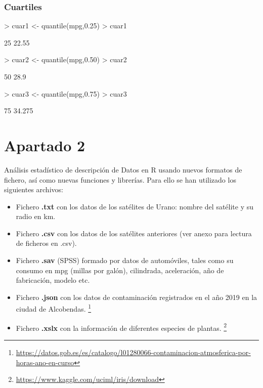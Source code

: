 \documentclass [a4paper] {article}
\begin{document}
\subsubsection{Cuartiles}
\begin{Schunk}
\begin{Sinput}
> cuar1 <- quantile(mpg,0.25)
> cuar1
\end{Sinput}
\begin{Soutput}
  25% 
22.55 
\end{Soutput}
\begin{Sinput}
> cuar2 <- quantile(mpg,0.50)
> cuar2
\end{Sinput}
\begin{Soutput}
 50% 
28.9 
\end{Soutput}
\begin{Sinput}
> cuar3 <- quantile(mpg,0.75)
> cuar3
\end{Sinput}
\begin{Soutput}
   75% 
34.275 
\end{Soutput}
\end{Schunk}

\section{Apartado 2}
Análisis estadístico de descripción de Datos en R usando nuevos formatos de fichero, así como nuevas funciones y librerías.
Para ello se han utilizado los siguientes archivos:

\begin{itemize}
	\item Fichero \textbf{.txt} con los datos de los satélites de Urano: nombre del satélite y su radio en km.
	\item Fichero \textbf{.csv} con los datos de los satélites anteriores (ver anexo para lectura de ficheros en .csv).
	\item Fichero \textbf{.sav} (SPSS) formado por datos de automóviles, tales como su consumo en mpg (millas por galón), cilindrada, aceleración, año de fabricación, modelo etc.
	\item Fichero \textbf{.json} con los datos de contaminación registrados en el año 2019 en la ciudad de Alcobendas. \footnote{\url{https://datos.gob.es/es/catalogo/l01280066-contaminacion-atmosferica-por-horas-ano-en-curso}}
	\item Fichero \textbf{.xslx} con la información de diferentes especies de plantas. \footnote{\url{https://www.kaggle.com/uciml/iris/download}}
\end{itemize}
\end{document}
